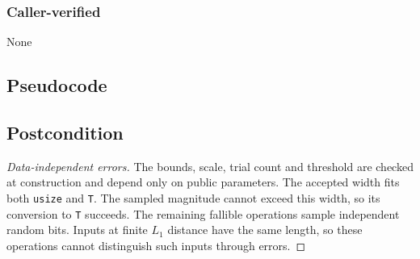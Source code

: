 \documentclass{article}
\begin{document}
\subsubsection*{Caller-verified}
None

\subsection*{Pseudocode}


\subsection*{Postcondition}
\begin{theorem}
\end{theorem}

\begin{proof}[Data-independent errors]
    The bounds, scale, trial count and threshold are checked at construction and depend only on public parameters.
    The accepted width fits both \texttt{usize} and \texttt{T}.
    The sampled magnitude cannot exceed this width, so its conversion to \texttt{T} succeeds.
    The remaining fallible operations sample independent random bits.
    Inputs at finite $L_1$ distance have the same length, so these operations cannot distinguish such inputs through errors.
\end{proof}
\end{document}
